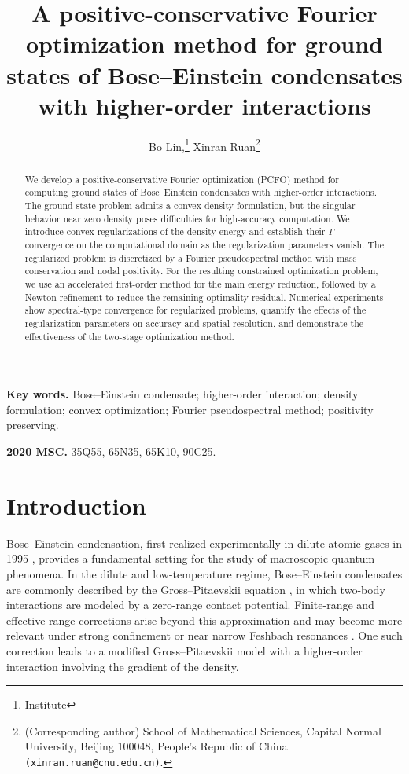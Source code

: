 \documentclass[11pt]{article}
\title{\bf
A positive-conservative Fourier optimization method for ground states of Bose--Einstein condensates with higher-order interactions
}
\author{
Bo Lin,\thanks{{\color{red} Institute}} \quad
Xinran Ruan\thanks{(Corresponding author) School of Mathematical Sciences, Capital Normal University, Beijing 100048, People's Republic of China {\tt (xinran.ruan@cnu.edu.cn)}.}
}
\date{}
\theoremstyle{plain}
\theoremstyle{definition}
\numberwithin{equation}{section}
\begin{document}
\maketitle

\begin{abstract}
We develop a positive-conservative Fourier optimization (PCFO) method
for computing ground states of Bose--Einstein condensates with
higher-order interactions. The ground-state problem admits a convex
density formulation, but the singular behavior near zero density
poses difficulties for high-accuracy computation. We introduce
convex regularizations of the density energy and establish their
$\Gamma$-convergence on the computational domain as the regularization
parameters vanish. The regularized problem is discretized by a
Fourier pseudospectral method with mass conservation and nodal
positivity. 
For the resulting constrained optimization problem, we use an accelerated
first-order method for the main energy reduction, followed by a Newton
refinement to reduce the remaining optimality residual. 
Numerical experiments show spectral-type convergence
for regularized problems, quantify the effects of the
regularization parameters on accuracy and spatial resolution, and
demonstrate the effectiveness of the two-stage optimization method.
\end{abstract}

\noindent
\textbf{Key words.}
Bose--Einstein condensate; higher-order interaction; density
formulation; convex optimization; Fourier
pseudospectral method; positivity preserving. 

\medskip

\noindent
\textbf{2020 MSC.}
35Q55, 65N35, 65K10, 90C25.


\section{Introduction}

Bose--Einstein condensation, first realized experimentally in dilute
atomic gases in 1995 \cite{Anderson1995}, provides a fundamental
setting for the study of macroscopic quantum phenomena. 
In the dilute and low-temperature regime, Bose--Einstein condensates are commonly
described by the Gross--Pitaevskii equation \cite{BaoCaiReview}, in
which two-body interactions are modeled by a zero-range contact
potential. Finite-range and effective-range corrections arise beyond
this approximation
\cite{CollinMassignanPethick2007,FuWangGao2003} and may become more
relevant under strong confinement or near narrow Feshbach resonances
\cite{Chin2010,VekslerFishmanKetterle2014,ZinnerThogersen2009}.
One such correction leads to a modified Gross--Pitaevskii model with
a higher-order interaction involving the gradient of the density.
\end{document}
